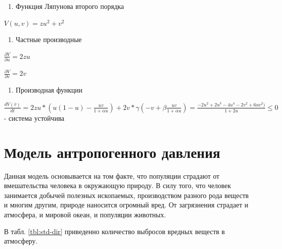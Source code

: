 \documentclass[
  13pt,
  fontsize=13pt,
  russian,
  a4paper,
,captions=tableheading
]{scrreprt}
\providecommand{\tightlist}{%
  \setlength{\itemsep}{0pt}\setlength{\parskip}{0pt}}
\begin{document}
\begin{enumerate}
\def\labelenumi{\arabic{enumi}.}
\tightlist
\item
  Функция Ляпунова второго порядка
\end{enumerate}

\(V(u,v)= zu^2+v^2\)

\begin{enumerate}
\def\labelenumi{\arabic{enumi}.}
\setcounter{enumi}{1}
\tightlist
\item
  Частные производные
\end{enumerate}

\(\frac{\partial V}{\partial u}=2zu\)

\(\frac{\partial V}{\partial v}=2v\)

\begin{enumerate}
\def\labelenumi{\arabic{enumi}.}
\setcounter{enumi}{2}
\tightlist
\item
  Производная функции
\end{enumerate}

\(\frac{dV(\bar v)}{dt}= 2zu * (u(1-u)-\frac{uv}{1+\alpha u}) + 2v*\gamma(-v+\beta \frac{uv}{1+\alpha u})=\frac{-2u^2+2u^3-4u^4-2v^2+6uv^2)}{1+2u}\leq0\)
- система устойчива

\hypertarget{ux43cux43eux434ux435ux43bux44c-ux430ux43dux442ux440ux43eux43fux43eux433ux435ux43dux43dux43eux433ux43e-ux434ux430ux432ux43bux435ux43dux438ux44f}{%
\section{Модель антропогенного
давления}\label{ux43cux43eux434ux435ux43bux44c-ux430ux43dux442ux440ux43eux43fux43eux433ux435ux43dux43dux43eux433ux43e-ux434ux430ux432ux43bux435ux43dux438ux44f}}

Данная модель основывается на том факте, что популяции страдают от
вмешательства человека в окружающую природу. В силу того, что человек
занимается добычей полезных ископаемых, производством разного рода
веществ и многим другим, природе наносится огромный вред. От загрязнения
страдает и атмосфера, и мировой океан, и популяции животных.

В табл. \ref{tbl:std-dir} приведенно количество выбросов вредных веществ
в атмосферу.
\end{document}
